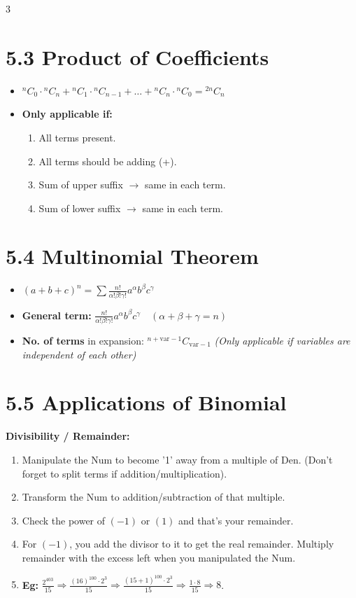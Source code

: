 \documentclass[11pt,a4paper,landscape]{article}
\begin{document}
\begin{multicols*}{3}
\section*{5.3 Product of Coefficients}
\begin{itemize}
\item ${}^nC_0 \cdot {}^nC_n + {}^nC_1 \cdot {}^nC_{n-1} + \dots + {}^nC_n \cdot {}^nC_0 = {}^{2n}C_n$
\item \textbf{Only applicable if:}
  \begin{enumerate}
  \item All terms present.
  \item All terms should be adding (+).
  \item Sum of upper suffix $\rightarrow$ same in each term.
  \item Sum of lower suffix $\rightarrow$ same in each term.
  \end{enumerate}
\end{itemize}

\section*{5.4 Multinomial Theorem}
\begin{itemize}
\item $(a+b+c)^n = \sum \frac{n!}{\alpha! \beta! \gamma!} a^\alpha b^\beta c^\gamma$
\item \textbf{General term:} $\frac{n!}{\alpha! \beta! \gamma!} a^\alpha b^\beta c^\gamma \quad (\alpha+\beta+\gamma = n)$
\item \textbf{No. of terms} in expansion: 
  ${}^{n + \text{var} - 1}C_{\text{var} - 1}$
  \textit{(Only applicable if variables are independent of each other)}
\end{itemize}

\section*{5.5 Applications of Binomial}
\textbf{Divisibility / Remainder:}
\begin{enumerate}
\item Manipulate the Num to become '1' away from a multiple of Den. (Don't forget to split terms if addition/multiplication).
\item Transform the Num to addition/subtraction of that multiple.
\item Check the power of $(-1)$ or $(1)$ and that's your remainder. 
\item For $(-1)$, you add the divisor to it to get the real remainder. Multiply remainder with the excess left when you manipulated the Num.
\item \textbf{Eg:} $\frac{2^{403}}{15} \Rightarrow \frac{(16)^{100} \cdot 2^3}{15} \Rightarrow \frac{(15+1)^{100} \cdot 2^3}{15} \Rightarrow \frac{1 \cdot 8}{15} \Rightarrow 8$.
\end{enumerate}


\end{multicols*}
\end{document}
